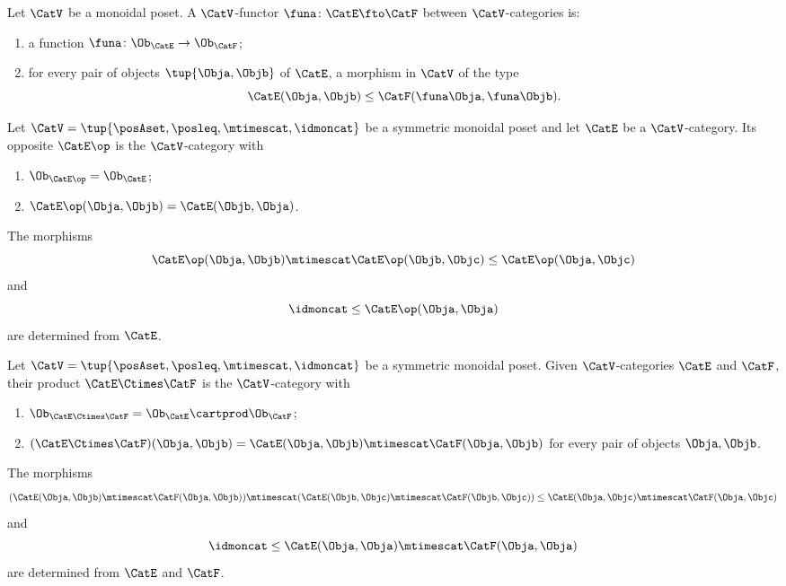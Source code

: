 \begin{ctdefinition}
\label{def:functor-monoidal-poset-enriched}
Let $\CatV$ be a monoidal poset. A $\CatV$-functor $\funa \colon \CatE \fto \CatF$ between $\CatV$-categories is:

\constit
\begin{enumerate}
\item a function $\funa \colon \Ob_\CatE \to \Ob_\CatF$;
\item for every pair of objects $\tup{\Obja, \Objb}$ of $\CatE$, a morphism in $\CatV$ of the type
\begin{equation}
\CatE(\Obja, \Objb) \leq \CatF(\funa \Obja, \funa \Objb). 
\end{equation}
\end{enumerate}
\end{ctdefinition}


\begin{ctdefinition}
\label{def:monoidal-poset-cat-op}
Let $\CatV = \tup{\posAset, \posleq, \mtimescat, \idmoncat}$ be a symmetric monoidal poset and let $\CatE$ be a $\CatV$-category. Its opposite $\CatE\op$ is the $\CatV$-category with 
\begin{enumerate}
\item $\Ob_{\CatE\op} = \Ob_\CatE$;
\item $\CatE\op(\Obja, \Objb) = \CatE(\Objb, \Obja)$.
\end{enumerate}

The morphisms 
\begin{equation}
\CatE\op(\Obja, \Objb) \mtimescat \CatE\op(\Objb, \Objc) \leq \CatE\op(\Obja, \Objc)
\end{equation}
and
\begin{equation}
\idmoncat \leq \CatE\op(\Obja, \Obja)
\end{equation}
are determined from $\CatE$.
\end{ctdefinition}

\begin{ctdefinition}
\label{def:monoidal-poset-cat-product}
Let $\CatV = \tup{\posAset, \posleq, \mtimescat, \idmoncat}$ be a symmetric monoidal poset. Given $\CatV$-categories $\CatE$ and $\CatF$, their product $\CatE \Ctimes \CatF$ is the $\CatV$-category with 
\begin{enumerate}
\item $\Ob_{\CatE \Ctimes \CatF} = \Ob_\CatE \cartprod \Ob_\CatF$;
\item $(\CatE \Ctimes \CatF)(\Obja, \Objb) = \CatE (\Obja, \Objb) \mtimescat \CatF (\Obja, \Objb)$ for every pair of objects $\Obja, \Objb$. 
\end{enumerate}
The morphisms 
\begin{equation}
(\CatE(\Obja, \Objb) \mtimescat \CatF(\Obja, \Objb)) \mtimescat (\CatE(\Objb, \Objc) \mtimescat \CatF(\Objb, \Objc)) \leq \CatE(\Obja, \Objc) \mtimescat  \CatF(\Obja, \Objc)
\end{equation}
and
\begin{equation}
\idmoncat \leq \CatE(\Obja, \Obja) \mtimescat \CatF(\Obja, \Obja)
\end{equation}
are determined from $\CatE$ and $\CatF$.
\end{ctdefinition}


